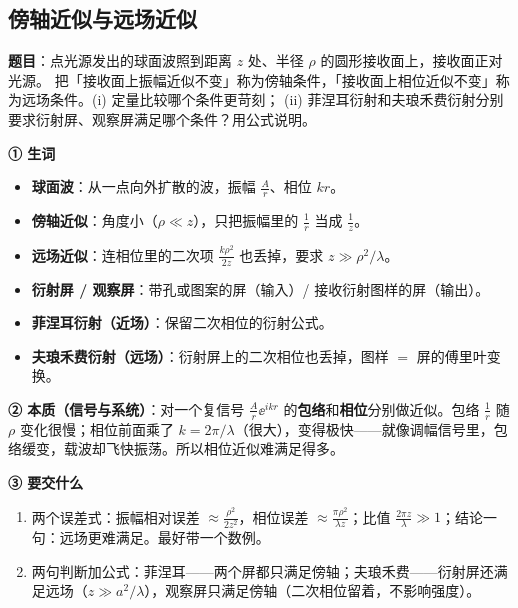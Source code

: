 \subsection{傍轴近似与远场近似}\label{ex:v-approx}
\noindent\textbf{题目}：点光源发出的球面波照到距离 $z$ 处、半径 $\rho$ 的圆形接收面上，接收面正对光源。
把「接收面上振幅近似不变」称为傍轴条件，「接收面上相位近似不变」称为远场条件。(i) 定量比较哪个条件更苛刻；
(ii) 菲涅耳衍射和夫琅禾费衍射分别要求衍射屏、观察屏满足哪个条件？用公式说明。

\label{rd:v-approx}
\begin{idea}[读题：概念与要交什么]
\textbf{① 生词}
\begin{itemize}
\item \textbf{球面波}：从一点向外扩散的波，振幅 $\frac{A}{r}$、相位 $kr$。
\item \textbf{傍轴近似}：角度小（$\rho\ll z$），只把振幅里的 $\frac1r$ 当成 $\frac1z$。
\item \textbf{远场近似}：连相位里的二次项 $\frac{k\rho^2}{2z}$ 也丢掉，要求 $z\gg\rho^2/\lambda$。
\item \textbf{衍射屏 / 观察屏}：带孔或图案的屏（输入）/ 接收衍射图样的屏（输出）。
\item \textbf{菲涅耳衍射（近场）}：保留二次相位的衍射公式。
\item \textbf{夫琅禾费衍射（远场）}：衍射屏上的二次相位也丢掉，图样 $=$ 屏的傅里叶变换。
\end{itemize}
\textbf{② 本质（信号与系统）}：对一个复信号 $\frac{A}{r}\ee^{ikr}$ 的\textbf{包络}和\textbf{相位}分别做近似。包络 $\frac1r$ 随 $\rho$ 变化很慢；相位前面乘了 $k=2\pi/\lambda$（很大），变得极快——就像调幅信号里，包络缓变，载波却飞快振荡。所以相位近似难满足得多。

\textbf{③ 要交什么}
\begin{enumerate}[label=(\roman*)]
\item 两个误差式：振幅相对误差 $\approx\frac{\rho^2}{2z^2}$，相位误差 $\approx\frac{\pi\rho^2}{\lambda z}$；比值 $\frac{2\pi z}{\lambda}\gg1$；结论一句：远场更难满足。最好带一个数例。
\item 两句判断加公式：菲涅耳——两个屏都只满足傍轴；夫琅禾费——衍射屏还满足远场（$z\gg a^2/\lambda$），观察屏只满足傍轴（二次相位留着，不影响强度）。
\end{enumerate}
\end{idea}


